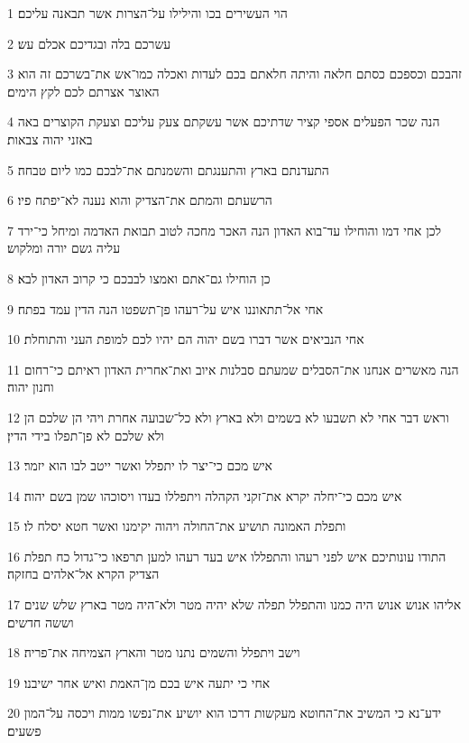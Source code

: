 \par 1 הוי העשירים בכו והילילו על־הצרות אשר תבאנה עליכם׃
\par 2 עשרכם בלה ובגדיכם אכלם עש׃
\par 3 זהבכם וכספכם כסתם חלאה והיתה חלאתם בכם לעדות ואכלה כמו־אש את־בשרכם זה הוא האוצר אצרתם לכם לקץ הימים׃
\par 4 הנה שכר הפעלים אספי קציר שדתיכם אשר עשקתם צעק עליכם וצעקת הקוצרים באה באזני יהוה צבאות׃
\par 5 התעדנתם בארץ והתענגתם והשמנתם את־לבכם כמו ליום טבחה׃
\par 6 הרשעתם והמתם את־הצדיק והוא נענה לא־יפתח פיו׃
\par 7 לכן אחי דמו והוחילו עד־בוא האדון הנה האכר מחכה לטוב תבואת האדמה ומיחל כי־ירד עליה גשם יורה ומלקוש׃
\par 8 כן הוחילו גם־אתם ואמצו לבבכם כי קרוב האדון לבא׃
\par 9 אחי אל־תתאוננו איש על־רעהו פן־תשפטו הנה הדין עמד בפתח׃
\par 10 אחי הנביאים אשר דברו בשם יהוה הם יהיו לכם למופת העני והתוחלת׃
\par 11 הנה מאשרים אנחנו את־הסבלים שמעתם סבלנות איוב ואת־אחרית האדון ראיתם כי־רחום וחנון יהוה׃
\par 12 וראש דבר אחי לא תשבעו לא בשמים ולא בארץ ולא כל־שבועה אחרת ויהי הן שלכם הן ולא שלכם לא פן־תפלו בידי הדין׃
\par 13 איש מכם כי־יצר לו יתפלל ואשר ייטב לבו הוא יזמר׃
\par 14 איש מכם כי־יחלה יקרא את־זקני הקהלה ויתפללו בעדו ויסוכהו שמן בשם יהוה׃
\par 15 ותפלת האמונה תושיע את־החולה ויהוה יקימנו ואשר חטא יסלח לו׃
\par 16 התודו עונותיכם איש לפני רעהו והתפללו איש בעד רעהו למען תרפאו כי־גדול כח תפלת הצדיק הקרא אל־אלהים בחזקה׃
\par 17 אליהו אנוש אנוש היה כמנו והתפלל תפלה שלא יהיה מטר ולא־היה מטר בארץ שלש שנים וששה חדשים׃
\par 18 וישב ויתפלל והשמים נתנו מטר והארץ הצמיחה את־פריה׃
\par 19 אחי כי יתעה איש בכם מן־האמת ואיש אחר ישיבנו׃
\par 20 ידע־נא כי המשיב את־החוטא מעקשות דרכו הוא יושיע את־נפשו ממות ויכסה על־המון פשעים׃


